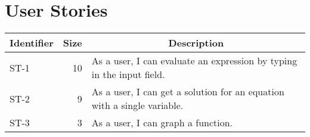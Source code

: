 \documentclass[letterpaper]{article}
\begin{document}
\newpage

\section{User Stories}

\begin{tabular}{|l|r|l|}
\hline
\multicolumn{1}{|c|}{\textbf{Identifier}} & \multicolumn{1}{c|}{\textbf{Size}} & \multicolumn{1}{c|}{\textbf{Description}} \\ \hline
ST-1 & 10 & As a user, I can evaluate an expression by typing in the input field. \\ \hline
ST-2 & 9  & As a user, I can get a solution for an equation with a single variable. \\ \hline
ST-3 & 3  & As a user, I can graph a function. \\ \hline
\end{tabular}
\end{document}
